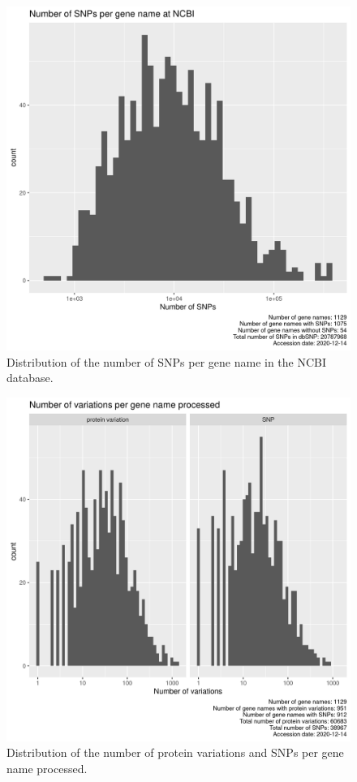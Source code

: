 \begin{figure}[!htbp]
  \includegraphics[width=\textwidth]{ncbi_peregrine_results/fig_snps_per_gene_name_ncbi.png}
  \caption{
    Distribution of the number of SNPs per gene name in the NCBI database.
  }
  \label{fig:snps_per_gene_name_ncbi}
\end{figure}

\begin{figure}[!htbp]
  \includegraphics[width=\textwidth]{ncbi_peregrine_results/fig_snps_per_gene_name_processed.png}
  \caption{
    Distribution of the number of protein variations and SNPs per gene name processed.
  }
  \label{fig:snps_per_gene_name_processed}
\end{figure}

